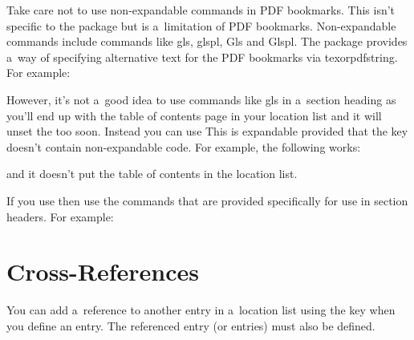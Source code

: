 \documentclass[titlepage=false,oneside,
 fontsize=12pt,captions=tableheading]{scrarticle}
\newcommand{\gloskeyval}[2]{\optval{gloskey.#1}{\marg{#2}}}
\begin{document}
Take care not to use non-expandable commands in PDF bookmarks. This
isn't specific to the  package but is a~limitation
of PDF bookmarks. Non-expandable commands include commands like 
\gls{gls}, \gls{glspl}, \gls{Gls} and \gls{Glspl}. The 
package provides a~way of specifying alternative text for the PDF
bookmarks via \gls{texorpdfstring}. For example:
\begin{codebox}
\end{codebox}
However, it's not a~good idea to use commands like \gls{gls} in
a~section heading as you'll end up with the table of contents page in 
your location list and it will unset the  too soon. 
Instead you can use
This is expandable provided that the  key doesn't
contain non-expandable code. For example, the following works:
\begin{codebox}
\end{codebox}
and it doesn't put the table of contents in the location list.

If you use  then use the commands that are
provided specifically for use in section headers. For example:
\begin{codebox*}
\end{codebox*}

\section{Cross-References}
\label{sec:xr}

You can add a~reference to another entry in a~location list using
the \gloskeyval{see}{\meta{label-list}} key when you define an entry. 
The referenced entry (or entries) must also be defined.
\end{document}
